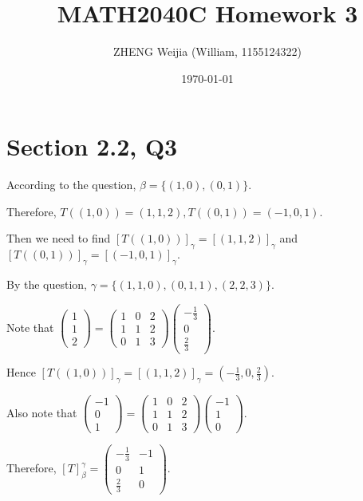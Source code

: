 \documentclass[12pt]{article}%
\begin{document}
\title{MATH2040C Homework 3}
\author{ZHENG Weijia (William, 1155124322)}
\date{\today}
\maketitle



\section{Section 2.2, Q3}

According to the question, $\beta=\{(1,0),(0,1)\}.$

Therefore, $T((1,0))=(1,1,2),T((0,1))=(-1,0,1).$ 

Then we need to find $[T((1,0))]_\gamma=[(1,1,2)]_\gamma$ and $[T((0,1))]_\gamma=[(-1,0,1)]_\gamma.$

By the question, $\gamma = \{(1,1,0),(0,1,1),(2,2,3)\}.$ 

Note that $\begin{pmatrix}1\\1\\2 \end{pmatrix}=\begin{pmatrix}1 & 0 & 2\\1 & 1& 2\\0&1&3\end{pmatrix} \begin{pmatrix} -\frac{1}{3}\\0\\\frac{2}{3} \end{pmatrix}. $

Hence $[T((1,0))]_\gamma=[(1,1,2)]_\gamma=(-\frac{1}{3},0,\frac{2}{3}).$ 

Also note that $\begin{pmatrix}-1\\0\\1 \end{pmatrix}=\begin{pmatrix}1 & 0 & 2\\1 & 1& 2\\0&1&3\end{pmatrix} \begin{pmatrix} -1\\1\\0 \end{pmatrix}. $

Therefore, $[T]_\beta^{\gamma}=\begin{pmatrix}-\frac{1}{3} & -1\\0 & 1\\\frac{2}{3} &0\end{pmatrix}.$ 
\end{document}

